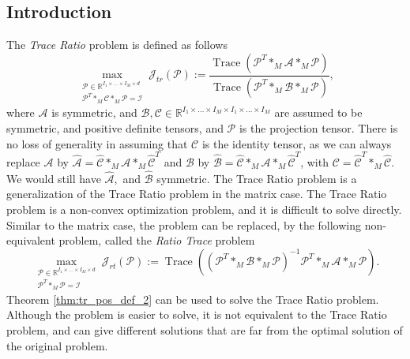 \documentclass{siamltex}
\begin{document}
\subsection{Introduction}
The \textit{ Trace Ratio} problem is defined as follows
\begin{equation}
\label{eq:trace_ratio}
\max_{\substack{\mathcal{P} \in \mathbb{R}^{I_1 \times \ldots \times I_M \times d}\\ \mathcal{P}^T *_M \mathcal{C} *_M \mathcal{P}=\mathcal{I}}} \mathcal{J}_{tr}(\mathcal{P}):=\frac{\operatorname{Trace}\left(\mathcal{P}^T *_M \mathcal{A} *_M \mathcal{P}\right)}{\operatorname{Trace}\left(\mathcal{P}^T *_M \mathcal{B} *_M \mathcal{P}\right)},
\end{equation}
where $\mathcal{A}$ is symmetric, and $\mathcal{B},\mathcal{C} \in \mathbb{R}^{I_1 \times \ldots \times I_M \times I_1 \times \ldots \times I_M}$ are assumed to be symmetric, and positive definite tensors, and $\mathcal{P}$ is the projection tensor. There is no loss of generality in assuming that $\mathcal{C}$ is the identity tensor, as we can always replace $\mathcal{A}$ by $\hat{\mathcal{A}}=\hat{\mathcal{C}} *_M \mathcal{A} *_M \hat{\mathcal{C}}^{T}$ and $\mathcal{B}$ by $\hat{\mathcal{B}}=\hat{\mathcal{C}} *_M \mathcal{A} *_M \hat{\mathcal{C}}^{T}$, with $\mathcal{C}= \hat{\mathcal{C}}^{T} *_M \hat{\mathcal{C}}$. We would still have $\hat{\mathcal{A}},$ and $\hat{\mathcal{B}}$ symmetric.
The Trace Ratio problem is a generalization of the Trace Ratio problem in the matrix case. The Trace Ratio problem is a non-convex optimization problem, and it is difficult to solve directly. 
Similar to the matrix case, the problem can be replaced, by the following non-equivalent problem, called the \textit{Ratio Trace} problem
\begin{equation}
\label{eq:ratio_trace}
\max_{\substack{\mathcal{P} \in \mathbb{R}^{I_1 \times \ldots \times I_M \times d} \\ \mathcal{P}^T *_M \mathcal{P}=\mathcal{I}}} \mathcal{J}_{rt}(\mathcal{P}):=\operatorname{Trace}\left( \left(\mathcal{P}^T *_M \mathcal{B} *_M \mathcal{P}\right)^{-1}\mathcal{P}^T *_M \mathcal{A} *_M \mathcal{P} \right).
\end{equation}
Theorem \ref{thm:tr_pos_def_2} can be used to solve the Trace Ratio problem.\\
Although the problem is easier to solve, it is not equivalent to the Trace Ratio problem, and can give different solutions that are far from the optimal solution of the original problem.
\end{document}
